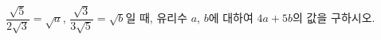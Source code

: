 $\dfrac{\sqrt{5}}{2\sqrt{3}}=\sqrt{a}$, $\dfrac{\sqrt{3}}{3\sqrt{5}}=\sqrt{b}$일 때, 유리수 $a$, $b$에 대하여 $4a+5b$의 값을 구하시오.
